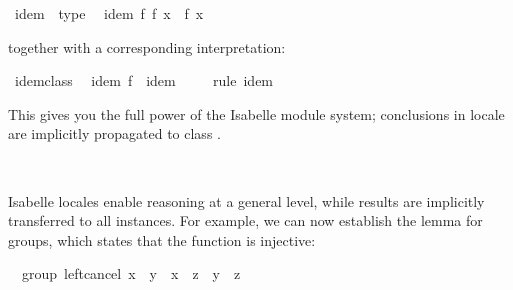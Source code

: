 \begin{isabellebody}
\isadeliminvisible
%
\endisadeliminvisible
%
\isataginvisible
%
\endisataginvisible
{\isafoldinvisible}%
%
\isadeliminvisible
%
\endisadeliminvisible
%
\isadelimquote
%
\endisadelimquote
%
\isatagquote
{}\isamarkupfalse%
\ idem\ {\isacharless}\ type\isanewline
\ \ idem{\isacharcolon}\ {\isachardoublequoteopen}f\ {\isacharparenleft}f\ x{\isacharparenright}\ {\isacharequal}\ f\ x{\isachardoublequoteclose}\ %
\endisatagquote
{\isafoldquote}%
%
\isadelimquote
%
\endisadelimquote
%
\isadeliminvisible
%
\endisadeliminvisible
%
\isataginvisible
%
\endisataginvisible
{\isafoldinvisible}%
%
\isadeliminvisible
%
\endisadeliminvisible
%
\begin{isamarkuptext}%
\noindent together with a corresponding interpretation:%
\end{isamarkuptext}%
\isamarkuptrue%
%
\isadelimquote
%
\endisadelimquote
%
\isatagquote
{}\isamarkupfalse%
\ idem{\isacharunderscore}class{\isacharcolon}\isanewline
\ \ idem\ {\isachardoublequoteopen}f\ {\isasymColon}\ {\isacharparenleft}{\isasymalpha}{\isasymColon}idem{\isacharparenright}\ {\isasymRightarrow}\ {\isasymalpha}{\isachardoublequoteclose}\isanewline
{}\isamarkupfalse%
\ \isamarkupfalse%
\ {\isacharparenleft}rule\ idem{\isacharparenright}%
\endisatagquote
{\isafoldquote}%
%
\isadelimquote
%
\endisadelimquote
%
\begin{isamarkuptext}%
\noindent This gives you the full power of the Isabelle module system;
  conclusions in locale  are implicitly propagated
  to class .%
\end{isamarkuptext}%
\isamarkuptrue%
\ %
\isadeliminvisible
%
\endisadeliminvisible
%
\isataginvisible
%
\endisataginvisible
{\isafoldinvisible}%
%
\isadeliminvisible
%
\endisadeliminvisible
%
\isamarkuptrue%
%
\begin{isamarkuptext}%
Isabelle locales enable reasoning at a general level, while results
  are implicitly transferred to all instances.  For example, we can
  now establish the  lemma for groups, which
  states that the function  is injective:%
\end{isamarkuptext}%
\isamarkuptrue%
%
\isadelimquote
%
\endisadelimquote
%
\isatagquote
{}\isamarkupfalse%
\ {\isacharparenleft}\ group{\isacharparenright}\ left{\isacharunderscore}cancel{\isacharcolon}\ {\isachardoublequoteopen}x\ {\isasymotimes}\ y\ {\isacharequal}\ x\ {\isasymotimes}\ z\ {\isasymlongleftrightarrow}\ y\ {\isacharequal}\ z{\isachardoublequoteclose}\isanewline

\end{isabellebody}
